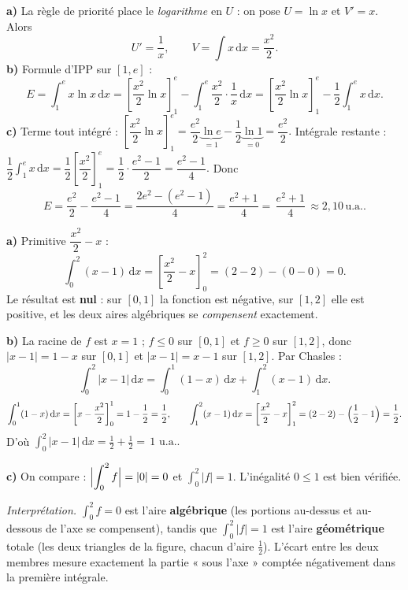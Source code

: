 \documentclass[11pt,a4paper]{article}
\newcommand{\dd}{\mathrm{d}}
\newcommand{\ua}{\,\text{u.a.}}
\begin{document}
\begin{corr}
\textbf{a)} La règle de priorité place le \emph{logarithme} en $U$ : on pose $U=\ln x$ et
$V'=x$. Alors
\[
U'=\frac1x,\qquad V=\int x\,\dd x=\frac{x^2}{2}.
\]
\textbf{b)} Formule d'IPP sur $[1,e]$ :
\[
E=\int_1^e x\ln x\,\dd x=\left[\frac{x^2}{2}\ln x\right]_1^e-\int_1^e \frac{x^2}{2}\cdot\frac1x\,\dd x
=\left[\frac{x^2}{2}\ln x\right]_1^e-\frac12\int_1^e x\,\dd x.
\]
\textbf{c)} Terme tout intégré : $\left[\dfrac{x^2}{2}\ln x\right]_1^e
=\dfrac{e^2}{2}\underbrace{\ln e}_{=1}-\dfrac{1}{2}\underbrace{\ln 1}_{=0}=\dfrac{e^2}{2}.$
Intégrale restante : $\dfrac12\displaystyle\int_1^e x\,\dd x=\dfrac12\left[\dfrac{x^2}{2}\right]_1^e
=\dfrac12\cdot\dfrac{e^2-1}{2}=\dfrac{e^2-1}{4}.$ Donc
\[
E=\frac{e^2}{2}-\frac{e^2-1}{4}=\frac{2e^2-(e^2-1)}{4}=\frac{e^2+1}{4}=\boxed{\,\frac{e^2+1}{4}\,}\approx 2{,}10\ua.
\]
\end{corr}

\begin{corr}
\textbf{a)} Primitive $\dfrac{x^2}{2}-x$ :
\[
\int_0^2 (x-1)\,\dd x=\left[\frac{x^2}{2}-x\right]_0^2=(2-2)-(0-0)=0.
\]
Le résultat est \textbf{nul} : sur $[0,1]$ la fonction est négative, sur $[1,2]$ elle est positive,
et les deux aires algébriques se \emph{compensent} exactement.

\smallskip
\textbf{b)} La racine de $f$ est $x=1$ ; $f\leqslant 0$ sur $[0,1]$ et $f\geqslant 0$ sur $[1,2]$, donc
$|x-1|=1-x$ sur $[0,1]$ et $|x-1|=x-1$ sur $[1,2]$. Par Chasles :
\[
\int_0^2|x-1|\,\dd x=\int_0^1(1-x)\,\dd x+\int_1^2(x-1)\,\dd x.
\]
\[
\int_0^1(1-x)\,\dd x=\left[x-\frac{x^2}{2}\right]_0^1=1-\frac12=\frac12,\qquad
\int_1^2(x-1)\,\dd x=\left[\frac{x^2}{2}-x\right]_1^2=(2-2)-\Bigl(\frac12-1\Bigr)=\frac12.
\]
D'où $\displaystyle\int_0^2|x-1|\,\dd x=\frac12+\frac12=\boxed{\,1\,}\ua.$

\smallskip
\textbf{c)} On compare : $\Bigl|\displaystyle\int_0^2 f\Bigr|=|0|=0$ et
$\displaystyle\int_0^2|f|=1$. L'inégalité $0\leqslant 1$ est bien vérifiée. \checkmark

\emph{Interprétation.} $\int_0^2 f=0$ est l'aire \textbf{algébrique} (les portions au-dessus et
au-dessous de l'axe se compensent), tandis que $\int_0^2|f|=1$ est l'aire \textbf{géométrique}
totale (les deux triangles de la figure, chacun d'aire $\tfrac12$). L'écart entre les deux membres
mesure exactement la partie « sous l'axe » comptée négativement dans la première intégrale.
\end{corr}
\end{document}
